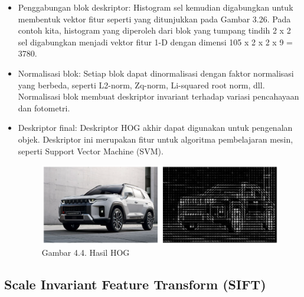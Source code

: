 \documentclass[
  letterpaper,
  DIV=11,
  numbers=noendperiod]{scrreprt}
\providecommand{\tightlist}{%
  \setlength{\itemsep}{0pt}\setlength{\parskip}{0pt}}\usepackage{longtable,booktabs,array}
\begin{document}
\begin{itemize}
\tightlist
\item
  Penggabungan blok deskriptor: Histogram sel kemudian digabungkan untuk
  membentuk vektor fitur seperti yang ditunjukkan pada Gambar 3.26. Pada
  contoh kita, histogram yang diperoleh dari blok yang tumpang tindih 2
  x 2 sel digabungkan menjadi vektor fitur 1-D dengan dimensi 105 x 2 x
  2 x 9 = 3780.\\
\item
  Normalisasi blok: Setiap blok dapat dinormalisasi dengan faktor
  normalisasi yang berbeda, seperti L2-norm, Zq-norm, Li-squared root
  norm, dll. Normalisasi blok membuat deskriptor invariant terhadap
  variasi pencahayaan dan fotometri.\\
\item
  Deskriptor final: Deskriptor HOG akhir dapat digunakan untuk
  pengenalan objek. Deskriptor ini merupakan fitur untuk algoritma
  pembelajaran mesin, seperti Support Vector Machine (SVM).\\

  \begin{figure}

  {\centering \includegraphics{Asset/image16.png}

  }

  \caption{Gambar 4.4. Hasil HOG}

  \end{figure}
\end{itemize}

\hypertarget{scale-invariant-feature-transform-sift}{%
\subsection*{Scale Invariant Feature Transform
(SIFT)}\label{scale-invariant-feature-transform-sift}}
\end{document}
